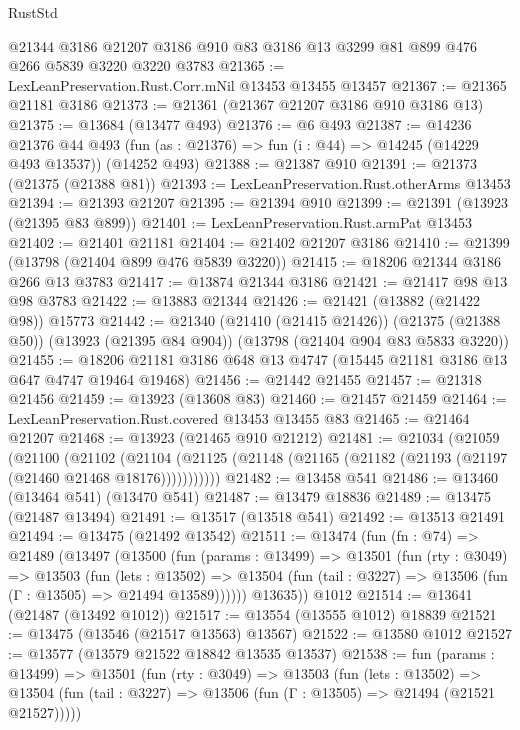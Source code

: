 \begin{lexlean}{RustStd}
\begin{coremodule}
    @21344
    @3186
    @21207
    @3186
    @910
    @83
    @3186
    @13
    @3299
    @81
    @899
    @476
    @266
    @5839
    @3220
    @3220
    @3783
@21365 := LexLeanPreservation.Rust.Corr.mNil @13453 @13455 @13457
@21367 := @21365 @21181 @3186
@21373 := @21361 (@21367 @21207 @3186 @910 @3186 @13)
@21375 := @13684 (@13477 @493)
@21376 := @6 @493
@21387 := @14236
    @21376
    @44
    @493
    (fun (as : @21376) => fun (i : @44) => @14245 (@14229 @493 @13537))
    (@14252 @493)
@21388 := @21387 @910
@21391 := @21373 (@21375 (@21388 @81))
@21393 := LexLeanPreservation.Rust.otherArms @13453
@21394 := @21393 @21207
@21395 := @21394 @910
@21399 := @21391 (@13923 (@21395 @83 @899))
@21401 := LexLeanPreservation.Rust.armPat @13453
@21402 := @21401 @21181
@21404 := @21402 @21207 @3186
@21410 := @21399 (@13798 (@21404 @899 @476 @5839 @3220))
@21415 := @18206 @21344 @3186 @266 @13 @3783
@21417 := @13874 @21344 @3186
@21421 := @21417 @98 @13 @98 @3783
@21422 := @13883 @21344
@21426 := @21421 (@13882 (@21422 @98)) @15773
@21442 := @21340
    (@21410 (@21415 @21426))
    (@21375 (@21388 @50))
    (@13923 (@21395 @84 @904))
    (@13798 (@21404 @904 @83 @5833 @3220))
@21455 := @18206 @21181 @3186 @648 @13 @4747 (@15445 @21181 @3186 @13 @647 @4747 @19464 @19468)
@21456 := @21442 @21455
@21457 := @21318 @21456
@21459 := @13923 (@13608 @83)
@21460 := @21457 @21459
@21464 := LexLeanPreservation.Rust.covered @13453 @13455 @83
@21465 := @21464 @21207
@21468 := @13923 (@21465 @910 @21212)
@21481 := @21034
    (@21059
      (@21100
        (@21102
          (@21104 (@21125 (@21148 (@21165 (@21182 (@21193 (@21197 (@21460 @21468 @18176)))))))))))
@21482 := @13458 @541
@21486 := @13460 (@13464 @541) (@13470 @541)
@21487 := @13479 @18836
@21489 := @13475 (@21487 @13494)
@21491 := @13517 (@13518 @541)
@21492 := @13513 @21491
@21494 := @13475 (@21492 @13542)
@21511 := @13474
    (fun (fn : @74) =>
    @21489
      (@13497
        (@13500
          (fun (params : @13499) =>
          @13501
            (fun (rty : @3049) =>
            @13503
              (fun (lets : @13502) =>
              @13504 (fun (tail : @3227) => @13506 (fun (Γ : @13505) => @21494 @13589))))))
        @13635))
    @1012
@21514 := @13641 (@21487 (@13492 @1012))
@21517 := @13554 (@13555 @1012) @18839
@21521 := @13475 (@13546 (@21517 @13563) @13567)
@21522 := @13580 @1012
@21527 := @13577 (@13579 @21522 @18842 @13535 @13537)
@21538 := fun (params : @13499) =>
  @13501
    (fun (rty : @3049) =>
    @13503
      (fun (lets : @13502) =>
      @13504 (fun (tail : @3227) => @13506 (fun (Γ : @13505) => @21494 (@21521 @21527)))))

\end{coremodule}
\end{lexlean}
